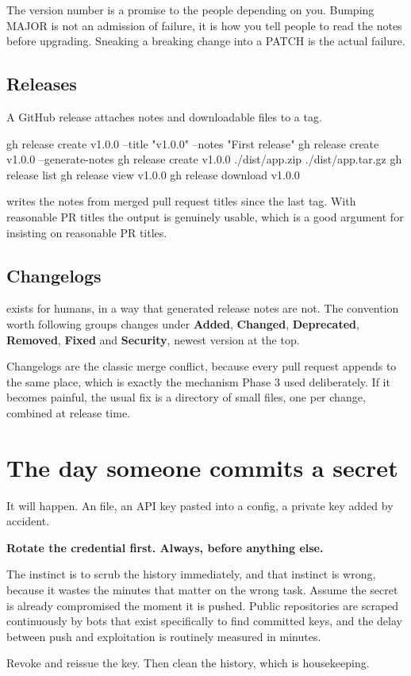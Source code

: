 \documentclass[11pt]{article}
\begin{document}
The version number is a promise to the people depending on you. Bumping MAJOR is not
an admission of failure, it is how you tell people to read the notes before
upgrading. Sneaking a breaking change into a PATCH is the actual failure.

\subsection{Releases}

A GitHub release attaches notes and downloadable files to a tag.

\begin{shell}
gh release create v1.0.0 --title "v1.0.0" --notes "First release"
gh release create v1.0.0 --generate-notes
gh release create v1.0.0 ./dist/app.zip ./dist/app.tar.gz
gh release list
gh release view v1.0.0
gh release download v1.0.0
\end{shell}

 writes the notes from merged pull request titles since the last
tag. With reasonable PR titles the output is genuinely usable, which is a good
argument for insisting on reasonable PR titles.

\subsection{Changelogs}

 exists for humans, in a way that generated release notes are not.
The convention worth following groups changes under \textbf{Added}, \textbf{Changed},
\textbf{Deprecated}, \textbf{Removed}, \textbf{Fixed} and \textbf{Security}, newest
version at the top.

\begin{note}
Changelogs are the classic merge conflict, because every pull request appends to the
same place, which is exactly the mechanism Phase 3 used deliberately. If it becomes
painful, the usual fix is a directory of small files, one per change, combined at
release time.
\end{note}

\section{The day someone commits a secret}

It will happen. An  file, an API key pasted into a config, a private key
added by accident.

\begin{trap}
\textbf{Rotate the credential first. Always, before anything else.}

The instinct is to scrub the history immediately, and that instinct is wrong,
because it wastes the minutes that matter on the wrong task. Assume the secret is
already compromised the moment it is pushed. Public repositories are scraped
continuously by bots that exist specifically to find committed keys, and the delay
between push and exploitation is routinely measured in minutes.

Revoke and reissue the key. Then clean the history, which is housekeeping.
\end{trap}
\end{document}
